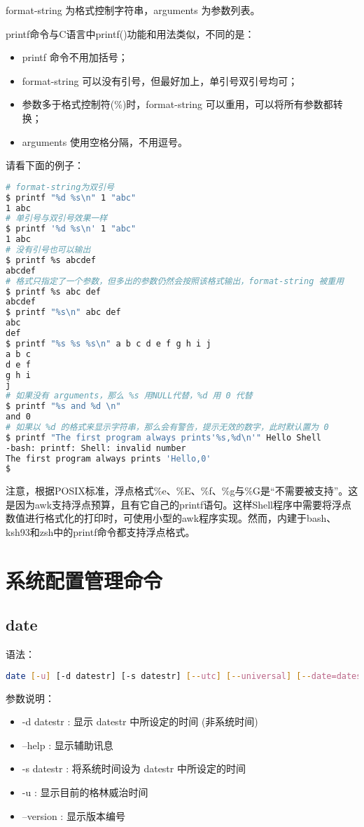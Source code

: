 format-string 为格式控制字符串，arguments 为参数列表。

printf命令与C语言中printf()功能和用法类似，不同的是：
\begin{itemize}
\item printf 命令不用加括号；
\item format-string 可以没有引号，但最好加上，单引号双引号均可；
\item 参数多于格式控制符(\%)时，format-string 可以重用，可以将所有参数都转换；
\item arguments 使用空格分隔，不用逗号。
\end{itemize}
请看下面的例子：
\begin{lstlisting}[language=sh]
# format-string为双引号
$ printf "%d %s\n" 1 "abc"
1 abc
# 单引号与双引号效果一样 
$ printf '%d %s\n' 1 "abc" 
1 abc
# 没有引号也可以输出
$ printf %s abcdef
abcdef
# 格式只指定了一个参数，但多出的参数仍然会按照该格式输出，format-string 被重用
$ printf %s abc def
abcdef
$ printf "%s\n" abc def
abc
def
$ printf "%s %s %s\n" a b c d e f g h i j
a b c
d e f
g h i
j
# 如果没有 arguments，那么 %s 用NULL代替，%d 用 0 代替
$ printf "%s and %d \n" 
and 0
# 如果以 %d 的格式来显示字符串，那么会有警告，提示无效的数字，此时默认置为 0
$ printf "The first program always prints'%s,%d\n'" Hello Shell
-bash: printf: Shell: invalid number
The first program always prints 'Hello,0'
$
\end{lstlisting}
注意，根据POSIX标准，浮点格式\%e、\%E、\%f、\%g与\%G是“不需要被支持”。这是因为awk支持浮点预算，且有它自己的printf语句。这样Shell程序中需要将浮点数值进行格式化的打印时，可使用小型的awk程序实现。然而，内建于bash、ksh93和zsh中的printf命令都支持浮点格式。



\section{系统配置管理命令}
\subsection{date}
语法：
\begin{lstlisting}[language=sh]
date [-u] [-d datestr] [-s datestr] [--utc] [--universal] [--date=datestr] [--set=datestr] [--help] [--version] [+FORMAT] [MMDDhhmm[[CC]YY][.ss]]
\end{lstlisting}

参数说明：
\begin{itemize}
\item -d datestr : 显示 datestr 中所设定的时间 (非系统时间)
\item --help : 显示辅助讯息
\item -s datestr : 将系统时间设为 datestr 中所设定的时间
\item -u : 显示目前的格林威治时间
\item --version : 显示版本编号
\end{itemize}

